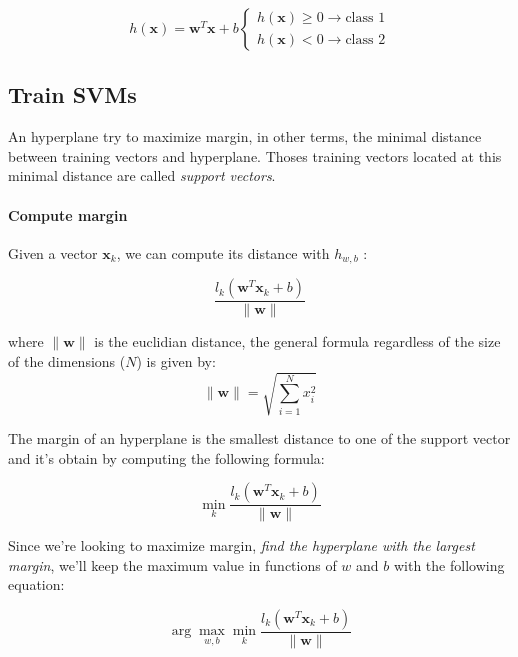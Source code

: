 \begin{equation}
	h(\mathbf x) = \mathbf w^T\mathbf x + b \begin{cases}h(\mathbf x)\geq 0\to \text{class 1} \\h(\mathbf x)< 0\to \text{class 2}\end{cases}
\end{equation}

\subsection{Train SVMs}

An hyperplane try to maximize margin, in other terms, the minimal distance between training vectors and hyperplane.
Thoses training vectors located at this minimal distance are called \textit{support vectors}.

\paragraph{Compute margin}

Given a vector $\mathbf x_k$, we can compute its distance with $h_{w,b}$ :

\begin{equation}
	\frac{l_k(\mathbf w^T\mathbf x_k + b)}{\lVert \mathbf w \rVert}
\end{equation}

where $\lVert \mathbf w \rVert$ is the euclidian distance, the general formula regardless of the size of the dimensions ($N$) is given by:
\begin{equation}
	\lVert \mathbf w \rVert = \sqrt{\sum_{i=1}^N x_i^2}
\end{equation}

The margin of an hyperplane is the smallest distance to one of the support vector and it's obtain by computing the following formula:

\begin{equation}
	\min_k \frac{l_k(\mathbf w^T\mathbf x_k + b)}{\lVert \mathbf w \rVert}
\end{equation}

Since we're looking to maximize margin, \textit{find the hyperplane with the largest margin}, we'll keep the maximum value in functions of $w$ and $b$ with the following equation:

\begin{equation}
	\arg\max_{w,b}\min_k \frac{l_k(\mathbf w^T\mathbf x_k + b)}{\lVert \mathbf w \rVert}
\end{equation}

